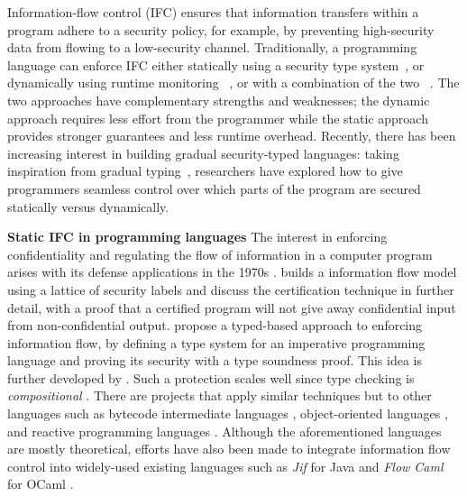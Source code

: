 Information-flow control (IFC) ensures that information transfers
within a program adhere to a security policy, for example, by
preventing high-security data from flowing to a low-security
channel.
Traditionally, a programming language can enforce IFC either statically
using a security type system~\parencite{volpano1996sound,Myers:1997aa,myers1999jflow},
or dynamically using runtime monitoring
~\parencite{Askarov:2009vq,austin2009efficient,Devriese:2010up,stefan2011flexible,Austin:2017uh},
or with a combination of the two
~\parencite{le2005monitoring,le2007automaton,Chandra:2007we,Shroff:2007tg}.
The two approaches have complementary strengths and weaknesses;
the dynamic approach requires less effort from the programmer
while the static approach provides stronger guarantees and
less runtime overhead. Recently, there has been increasing interest in
building gradual security-typed languages: taking inspiration from
gradual typing~\parencite{Siek:2006bh,Siek:2007qy,Tobin-Hochstadt:2006fk, Matthews:2007zr},
researchers have explored how to give programmers seamless control over
which parts of the program are secured statically versus dynamically.

\textbf{Static IFC in programming languages}
The interest in enforcing confidentiality and regulating the flow of
information in a computer program arises with its defense applications
in the 1970s \autocite{bell1976secure}.
\textcite{denning1976lattice}
builds a information flow model using a lattice of security labels and
\textcite{denning1977certification} discuss the certification technique
in further detail, with a proof that a certified program will not give
away confidential input from non-confidential output.
\textcite{volpano1996sound} propose a typed-based approach to enforcing
information flow, by defining a type system for an imperative
programming language and proving its security with a type soundness
proof. This idea is further developed by
\textcite{zdancewic2002programming}.  Such a protection scales well since
type checking is \textit{compositional}
\parencite{sabelfeld2003language}. There are projects that apply similar
techniques but to other languages
such as bytecode intermediate languages
\autocite{barthe2005non}, object-oriented languages
\autocite{amtoft2006logic}, and reactive programming languages
\autocite{bohannon2009reactive}. Although the aforementioned languages are
mostly theoretical, efforts have also been made to integrate information
flow control into widely-used existing languages such as \textit{Jif}
for Java \autocite{myers1999jflow} and \textit{Flow Caml} for OCaml
\autocite{pottier2002information, simonet2003flow}.

